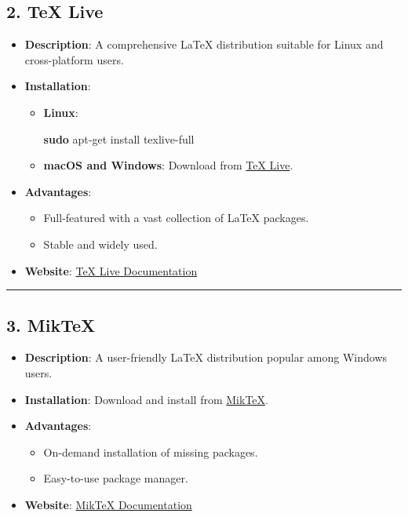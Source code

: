 \documentclass[
]{book}
\newenvironment{Shaded}{\begin{snugshade}}{\end{snugshade}}
\newcommand{\FunctionTok}[1]{\textcolor[rgb]{0.13,0.29,0.53}{\textbf{#1}}}
\newcommand{\NormalTok}[1]{#1}
\providecommand{\tightlist}{%
  \setlength{\itemsep}{0pt}\setlength{\parskip}{0pt}}
\theoremstyle{definition}
\theoremstyle{definition}
\theoremstyle{definition}
\theoremstyle{definition}
\theoremstyle{remark}
\begin{document}
\subsection{\texorpdfstring{2. \textbf{TeX Live}}{2. TeX Live}}\label{tex-live-1}

\begin{itemize}
\tightlist
\item
  \textbf{Description}: A comprehensive LaTeX distribution suitable for Linux and cross-platform users.
\item
  \textbf{Installation}:

  \begin{itemize}
  \item
    \textbf{Linux}:

\begin{Shaded}
\begin{Highlighting}[]
\FunctionTok{sudo}\NormalTok{ apt{-}get install texlive{-}full}
\end{Highlighting}
\end{Shaded}
  \item
    \textbf{macOS and Windows}: Download from \href{https://www.tug.org/texlive/}{TeX Live}.
  \end{itemize}
\item
  \textbf{Advantages}:

  \begin{itemize}
  \tightlist
  \item
    Full-featured with a vast collection of LaTeX packages.
  \item
    Stable and widely used.
  \end{itemize}
\item
  \textbf{Website}: \href{https://www.tug.org/texlive/}{TeX Live Documentation}
\end{itemize}

\begin{center}\rule{0.5\linewidth}{0.5pt}\end{center}

\subsection{\texorpdfstring{3. \textbf{MikTeX}}{3. MikTeX}}\label{miktex-1}

\begin{itemize}
\tightlist
\item
  \textbf{Description}: A user-friendly LaTeX distribution popular among Windows users.
\item
  \textbf{Installation}: Download and install from \href{https://miktex.org/}{MikTeX}.
\item
  \textbf{Advantages}:

  \begin{itemize}
  \tightlist
  \item
    On-demand installation of missing packages.
  \item
    Easy-to-use package manager.
  \end{itemize}
\item
  \textbf{Website}: \href{https://miktex.org/}{MikTeX Documentation}
\end{itemize}
\end{document}
